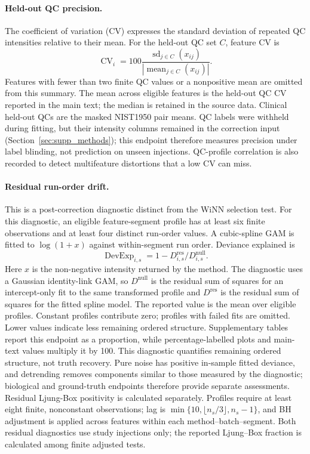 \documentclass[namedate,webpdf,modern,large,nocrop]{oup-authoring-template}
\begin{document}
\paragraph{Held-out QC precision.} The coefficient of variation (CV) expresses the standard deviation of repeated QC intensities relative to their mean. For the held-out QC set \(C\), feature CV is
\[
\operatorname{CV}_i=100\frac{\operatorname{sd}_{j\in C}(x_{ij})}{\left|\operatorname{mean}_{j\in C}(x_{ij})\right|}.
\]
Features with fewer than two finite QC values or a nonpositive mean are omitted from this summary. The mean across eligible features is the held-out QC CV reported in the main text; the median is retained in the source data. Clinical held-out QCs are the masked NIST1950 pair means. QC labels were withheld during fitting, but their intensity columns remained in the correction input (Section~\ref{sec:supp_methods}); this endpoint therefore measures precision under label blinding, not prediction on unseen injections. QC-profile correlation is also recorded to detect multifeature distortions that a low CV can miss.

\paragraph{Residual run-order drift.} This is a post-correction diagnostic distinct from the WiNN selection test. For this diagnostic, an eligible feature-segment profile has at least six finite observations and at least four distinct run-order values. A cubic-spline GAM is fitted to \(\log(1+x)\) against within-segment run order. Deviance explained is
\[
\operatorname{DevExp}_{i,s}=1-D_{i,s}^{\mathrm{res}}/D_{i,s}^{\mathrm{null}}.
\]
Here \(x\) is the non-negative intensity returned by the method. The diagnostic uses a Gaussian identity-link GAM, so \(D^{\mathrm{null}}\) is the residual sum of squares for an intercept-only fit to the same transformed profile and \(D^{\mathrm{res}}\) is the residual sum of squares for the fitted spline model. The reported value is the mean over eligible profiles. Constant profiles contribute zero; profiles with failed fits are omitted. Lower values indicate less remaining ordered structure. Supplementary tables report this endpoint as a proportion, while percentage-labelled plots and main-text values multiply it by 100. This diagnostic quantifies remaining ordered structure, not truth recovery. Pure noise has positive in-sample fitted deviance, and detrending removes components similar to those measured by the diagnostic; biological and ground-truth endpoints therefore provide separate assessments. Residual Ljung-Box positivity is calculated separately. Profiles require at least eight finite, nonconstant observations; lag is \(\min\{10,\lfloor n_s/3\rfloor,n_s-1\}\), and BH adjustment is applied across features within each method--batch--segment. Both residual diagnostics use study injections only; the reported Ljung--Box fraction is calculated among finite adjusted tests.
\end{document}
